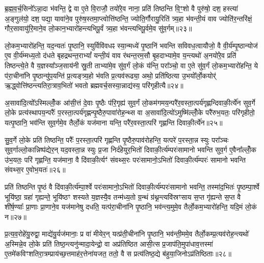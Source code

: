 ब्र॒ह्म॒व॒र्च॒सिनो᳚\-ऽन्ना॒दा भ॑वन्ति॒ द्वे वा ए॒ते वि॒राजौ॒ तयो॑रे॒व नाना॒ प्रति॑ तिष्ठन्ति वि॒ꣳ॒शो वै पुरु॑षो॒ दश॒ हस्त्या॑ अ॒ङ्गुल॑यो॒ दश॒ पद्या॒ यावा॑ने॒व पुरु॑ष॒स्तमा॒प्त्वोत्ति॑ष्ठन्ति॒ ज्योति॒र्गौरायु॒रिति॑ त्र्य॒हा भ॑वन्ती॒यं वाव ज्योति॑र॒न्तरि॑क्षं॒ गौर॒सावायु॑रि॒माने॒व लो॒कान॒भ्यारो॑हन्त्यभिपू॒र्वं त्र्य॒हा भ॑वन्त्यभिपू॒र्वमे॒व सु॑व॒र्गम्॥२३॥

लो॒कम॒भ्यारो॑हन्ति॒ यद॒न्यतः॑ पृ॒ष्ठानि॒ स्युर्विवि॑वधꣴ स्या॒न्मध्ये॑ पृ॒ष्ठानि॑ भवन्ति सविवध॒त्वायौजो॒ वै वी॒र्य॑म्पृ॒ष्ठान्योज॑ ए॒व वी॒र्य॑म्मध्य॒तो द॑धते बृहद्रथन्त॒रा\-भ्यां᳚ यन्ती॒यं वाव र॑थन्त॒रम॒सौ बृ॒हदाभ्यामे॒व य॒न्त्यथो॑ अ॒नयो॑रे॒व प्रति॑ तिष्ठन्त्ये॒ते वै य॒ज्ञस्या᳚ञ्ज॒साय॑नी स्रु॒ती ताभ्या॑मे॒व सु॑व॒र्गं लो॒कं य॑न्ति॒ परा᳚ञ्चो॒ वा ए॒ते सु॑व॒र्गं लो॒कम॒भ्यारो॑हन्ति॒ ये प॑रा॒चीना॑नि पृ॒ष्ठान्यु॑प॒यन्ति॑ प्र॒त्यङ्त्र्य॒हो भ॑वति प्र॒त्यव॑रूढ्या॒ अथो॒ प्रति॑ष्ठित्या उ॒भयो᳚र्लो॒कयोर्॑ ऋ॒द्ध्वोत्ति॑ष्ठन्त्यतिरा॒त्राव॒भितो॑ भवतो ब्रह्मवर्च॒सस्या॒न्नाद्य॑स्य॒ परि॑गृहीत्यै॥२४॥

{\anuvakamend[{वृ॒ञ्ज॒ते॒ ब्रह्म॒ चान्न॑ञ्च सुव॒र्गमे॒ते सु॑व॒र्गन्त्रयो॑विꣳशतिश्च॥९॥}]}

अ॒सावा॑दि॒त्यो᳚\-ऽस्मिल्लोँ॒क आ॑सी॒त्तं दे॒वाः पृ॒ष्ठैः प॑रि॒गृह्य॑ सुव॒र्गं लो॒कम॑गमय॒न्परै॑र॒वस्ता॒त्पर्य॑गृह्णन्दिवाकी॒र्त्ये॑न सुव॒र्गे लो॒के प्रत्य॑स्थापय॒न्परैः᳚ प॒रस्ता॒त्पर्य॑गृह्णन्पृ॒ष्ठैरु॒पावा॑रोह॒न्थ्स वा अ॒सावा॑दि॒त्यो॑\-ऽमुष्मि॑ल्लोँ॒के परै॑रुभ॒यतः॒ परि॑गृहीतो॒ यत्पृ॒ष्ठानि॒ भव॑न्ति सुव॒र्गमे॒व तैर्लो॒कं यज॑माना यन्ति॒ परै॑र॒वस्ता॒त्परि॑ गृह्णन्ति दिवाकी॒र्त्ये॑न॥२५॥

सु॒व॒र्गे लो॒के प्रति॑ तिष्ठन्ति॒ परैः᳚ प॒रस्ता॒त्परि॑ गृह्णन्ति पृ॒ष्ठैरु॒पाव॑रोहन्ति॒ यत्परे॑ प॒रस्ता॒न्न स्युः परा᳚ञ्चः सुव॒र्गाल्लो॒कान्निष्प॑द्येर॒न् यद॒वस्ता॒न्न स्युः प्र॒जा निर्द॑हेयुर॒भितो॑ दिवाकी॒र्त्य॑म्परः॑सामानो भवन्ति सुव॒र्ग ए॒वैना᳚ल्लोँ॒क उ॑भ॒यतः॒ परि॑ गृह्णन्ति॒ यज॑माना॒ वै दि॑वाकी॒र्त्यꣳ॑ संवथ्स॒रः परः॑सामानो॒\-ऽभितो॑ दिवाकी॒र्त्य॑म्परः॑ सामानो भवन्ति संवथ्स॒र ए॒वोभ॒यतः॑॥२६॥

प्रति॑ तिष्ठन्ति पृ॒ष्ठं वै दि॑वाकी॒र्त्य॑म्पा॒र्श्वे परः॑सामानो॒\-ऽभितो॑ दिवाकी॒र्त्य॑म्परः॑सामानो भवन्ति॒ तस्मा॑द॒भितः॑ पृ॒ष्ठम्पा॒र्श्वे भूयि॑ष्ठा॒ ग्रहा॑ गृह्यन्ते॒ भूयि॑ष्ठꣳ शस्यते य॒ज्ञस्यै॒व तन्म॑ध्य॒तो ग्र॒न्थं ग्र॑थ्न॒न्त्यवि॑स्रꣳसाय स॒प्त गृ॑ह्यन्ते स॒प्त वै शी॑र्\mbox{}ष॒ण्याः᳚ प्रा॒णाः प्रा॒णाने॒व यज॑मानेषु दधति॒ यत्प॑रा॒चीना॑नि पृ॒ष्ठानि॒ भव॑न्त्य॒मुमे॒व तैर्लो॒कम॒भ्यारो॑हन्ति॒ यदि॒मं लो॒कं न॥२७॥

प्र॒त्य॒व॒रोहे॑यु॒रुद्वा॒ माद्ये॑यु॒र्यज॑मानाः॒ प्र वा॑ मीयेर॒न् यत्प्र॑ती॒चीना॑नि पृ॒ष्ठानि॒ भव॑न्ती॒ममे॒व तैर्लो॒कम्प्र॒त्यव॑रोह॒न्त्यथो॑ अ॒स्मिन्ने॒व लो॒के प्रति॑ तिष्ठ॒न्त्यनु॑न्मादा॒येन्द्रो॒ वा अप्र॑तिष्ठित आसी॒त्स प्र॒जाप॑ति॒मुपा॑धाव॒त्तस्मा॑ ए॒तमे॑कविꣳशतिरा॒त्रम्प्राय॑च्छ॒त्तमाह॑र॒त्तेना॑यजत॒ ततो॒ वै स प्रत्य॑तिष्ठ॒द्ये ब॑हुया॒जिनो\-ऽप्र॑तिष्ठिताः॥२८॥


